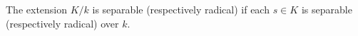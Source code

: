 The extension $K/k$ is separable (respectively radical) if each $s \in K$ is separable (respectively radical) over $k$.
